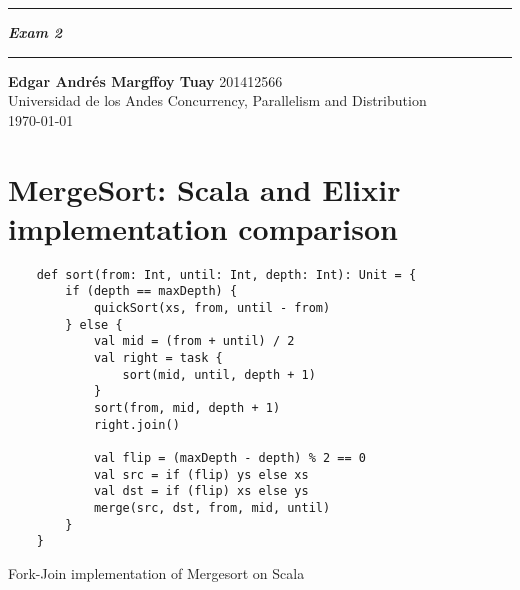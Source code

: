 \documentclass{article}
\newcommand{\squishlist}{
 \begin{list}{$\bullet$}
  { \setlength{\itemsep}{0pt}
     \setlength{\parsep}{3pt}
     \setlength{\topsep}{3pt}
     \setlength{\partopsep}{0pt}
     \setlength{\leftmargin}{1.5em}
     \setlength{\labelwidth}{1em}
     \setlength{\labelsep}{0.5em} } }
\newcommand{\squishend}{
  \end{list}  }
\begin{document}
 \def\maketitle{%
 \thispagestyle{plain}
 \vspace{-10ex}
 \hrule
 \bigskip
 \begin{center}
 {\Large{\textbf{\@title}}}
 \end{center}
 \bigskip
 \hrule

 \bigskip

 \begin{flushleft}
 \textbf{\normalsize{Edgar Andr\'{e}s Margffoy Tuay}} \hfill 201412566
 \\
 \vspace{5pt}
 Universidad de los Andes \hfill Concurrency, Parallelism and Distribution
 \\
 \vspace{5pt}
\hfill \today \\ 
 \end{flushleft}
 }
\def\title#1{\def\@title{#1}}
\title{\textit{Exam 2}}



\maketitle

\section{MergeSort: Scala and Elixir implementation comparison}
\begin{listing}
	\begin{verbatim}
	def sort(from: Int, until: Int, depth: Int): Unit = {
		if (depth == maxDepth) {
			quickSort(xs, from, until - from)
		} else {
			val mid = (from + until) / 2
			val right = task {
				sort(mid, until, depth + 1)
			}
			sort(from, mid, depth + 1)
			right.join()
	
			val flip = (maxDepth - depth) % 2 == 0
			val src = if (flip) ys else xs
			val dst = if (flip) xs else ys
			merge(src, dst, from, mid, until)
		}
	}
	\end{verbatim}
	\caption{Fork-Join implementation of Mergesort on Scala}
	\label{lst:L1}
\end{listing}
\end{document}
